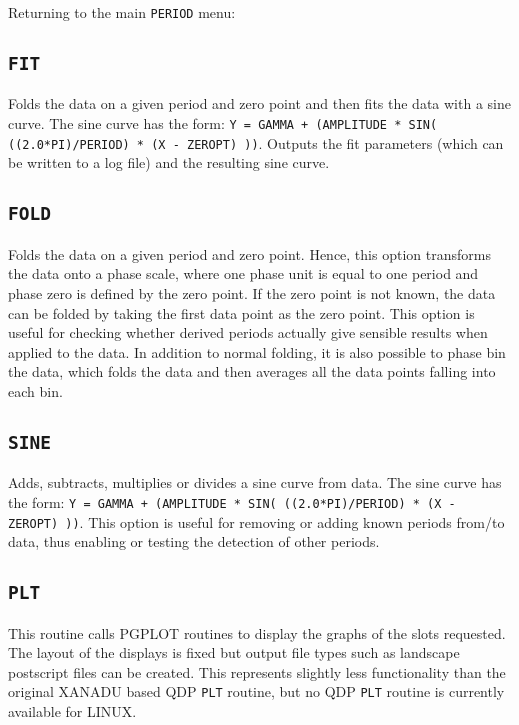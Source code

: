 \clearpage
Returning to the main {\tt PERIOD} menu:

\subsection*{\tt FIT}

Folds the data on a given period and zero point and then fits the data with a
sine curve. The sine curve has the form: {\tt Y = GAMMA + (AMPLITUDE * SIN(
((2.0*PI)/PERIOD) * (X - ZEROPT) ))}. Outputs the fit parameters (which can be
written to a log file) and the resulting sine curve. 

\subsection*{\tt FOLD}

Folds the data on a given period and zero point. Hence, this option transforms
the data onto a phase scale, where one phase unit is equal to one period and
phase zero is defined by the zero point. If the zero point is not known, the
data can be folded by taking the first data point as the zero point. This
option is useful for checking whether derived periods actually give sensible
results when applied to the data. In addition to normal folding, it is also
possible to phase bin the data, which folds the data and then averages all the
data points falling into each bin. 

\subsection*{\tt SINE}

Adds, subtracts, multiplies or divides a sine curve from data. The sine curve
has the form: {\tt Y = GAMMA + (AMPLITUDE * SIN( ((2.0*PI)/PERIOD) * (X -
ZEROPT) ))}. This option is useful for removing or adding known periods from/to
data, thus enabling or testing the detection of other periods. 

\subsection*{\tt PLT}

This routine calls PGPLOT routines to display the graphs of the slots 
requested. The layout of the displays is fixed but output file
types such as landscape postscript files can be created. This 
represents slightly less functionality than the original XANADU based
QDP {\tt PLT} routine, but no QDP {\tt PLT} routine is currently available for 
LINUX. 

